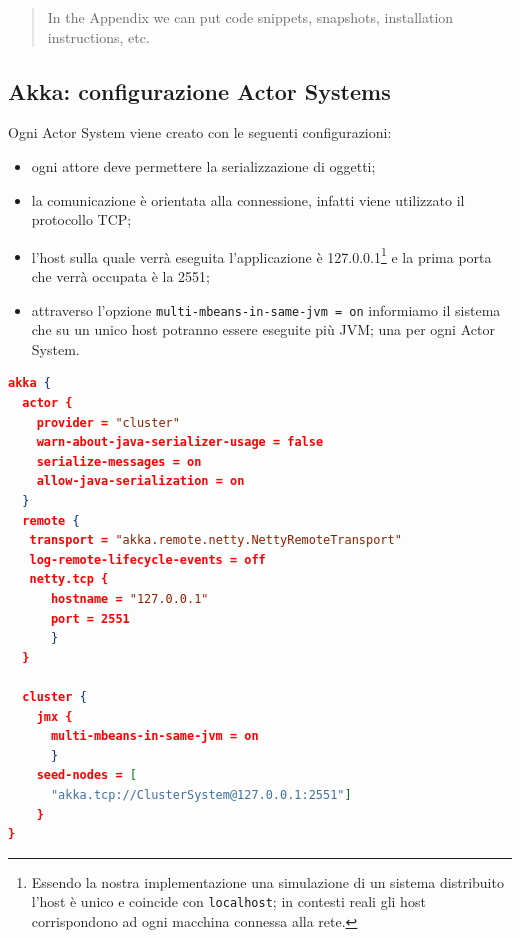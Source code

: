 

\begin{quote}
In the Appendix we can put code snippets, snapshots,
installation instructions, etc.
\end{quote}
\subsection{Akka: configurazione Actor Systems}
\label{sec:akkaconf}
Ogni Actor System viene creato con le seguenti configurazioni:
\begin{itemize}
	\item ogni attore deve permettere la serializzazione di oggetti;
	\item la comunicazione è orientata alla connessione, infatti viene utilizzato il protocollo TCP;
	\item l'host sulla quale verrà eseguita l'applicazione è 127.0.0.1\footnote{Essendo la nostra implementazione una simulazione di un sistema distribuito l'host è unico e coincide con \texttt{localhost}; in contesti reali gli host corrispondono ad ogni macchina connessa alla rete. } e la prima porta che verrà occupata è la 2551;
	\item attraverso l'opzione \texttt{multi-mbeans-in-same-jvm = on} informiamo il sistema che su un unico host potranno essere eseguite più JVM; una per ogni Actor System.
\end{itemize}
\begin{lstlisting}[language=json]
akka {
  actor {
    provider = "cluster"
    warn-about-java-serializer-usage = false
    serialize-messages = on
    allow-java-serialization = on
  }
  remote {
   transport = "akka.remote.netty.NettyRemoteTransport"
   log-remote-lifecycle-events = off
   netty.tcp {
      hostname = "127.0.0.1"
      port = 2551
      }
  }

  cluster {
    jmx {
      multi-mbeans-in-same-jvm = on
      }
    seed-nodes = [
      "akka.tcp://ClusterSystem@127.0.0.1:2551"]
    }
}
\end{lstlisting}

